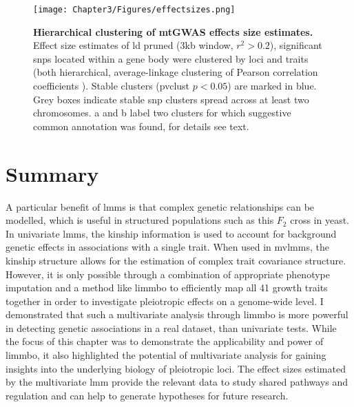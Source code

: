 \begin{figure}[hbtp]
	\centering
	\texttt{[image: Chapter3/Figures/effectsizes.png]}
	\caption[\textbf{Hierarchical clustering of mtGWAS effects size estimates.}]{\textbf{Hierarchical clustering of mtGWAS effects size estimates.} Effect size estimates of \gls{ld} pruned (\num{3}kb window, \(r^2 > 0.2\)), significant \glspl{snp} located within a gene body were clustered by loci and traits (both hierarchical, average-linkage clustering of Pearson correlation coefficients ). Stable clusters (pvclust \( p < 0.05\)) are marked in blue. Grey boxes indicate stable \gls{snp} clusters spread across at least two chromosomes. a and b label two clusters for which suggestive common annotation was found, for details see text.}
 	\label{fig:effectsizes}
\end{figure}

\section{Summary}
A particular benefit of \glspl{lmm} is that complex genetic relationships can be modelled, which is useful in structured populations such as this \(F_2\) cross in yeast. In univariate \glspl{lmm}, the kinship information is used to account for background genetic effects in associations with a single trait. When used in \glspl{mvlmm}, the kinship structure allows for the estimation of complex trait covariance structure. However, it is only possible through a combination of appropriate phenotype imputation and a method like \gls{limmbo} to efficiently map all \num{41} growth traits together in order to investigate pleiotropic effects on a genome-wide level. I demonstrated that such a multivariate analysis through \gls{limmbo} is more powerful in detecting genetic associations in a real dataset, than univariate tests. While the focus of this chapter was to demonstrate the applicability and power of \gls{limmbo}, it also highlighted the potential of multivariate analysis for gaining insights into the underlying biology of pleiotropic loci. The effect sizes estimated by the multivariate \gls{lmm} provide the relevant data to study shared pathways and regulation and can help to generate hypotheses for future research.
